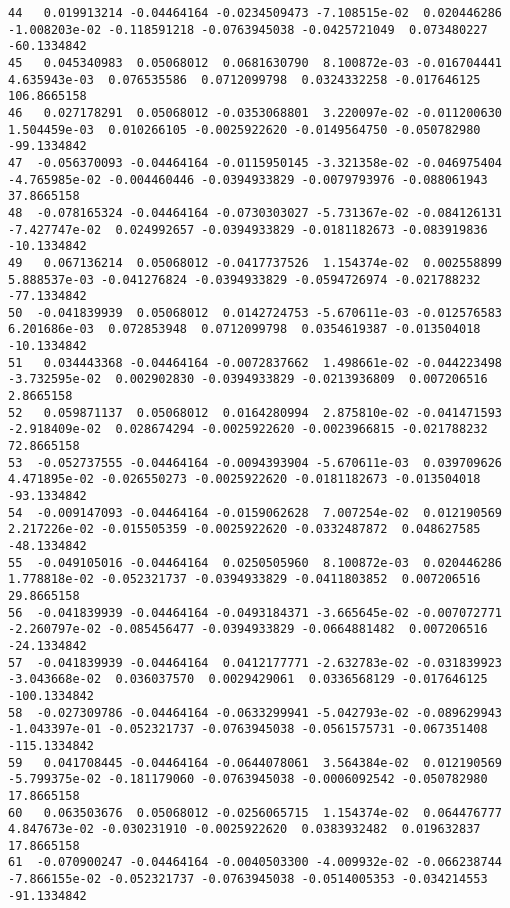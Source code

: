 \documentclass[15pt,a4paper,openright]{article}
\begin{document}
\begin{lstlisting}[language=AMPL, caption = data file]
44   0.019913214 -0.04464164 -0.0234509473 -7.108515e-02  0.020446286 -1.008203e-02 -0.118591218 -0.0763945038 -0.0425721049  0.073480227  -60.1334842
45   0.045340983  0.05068012  0.0681630790  8.100872e-03 -0.016704441  4.635943e-03  0.076535586  0.0712099798  0.0324332258 -0.017646125  106.8665158
46   0.027178291  0.05068012 -0.0353068801  3.220097e-02 -0.011200630  1.504459e-03  0.010266105 -0.0025922620 -0.0149564750 -0.050782980  -99.1334842
47  -0.056370093 -0.04464164 -0.0115950145 -3.321358e-02 -0.046975404 -4.765985e-02 -0.004460446 -0.0394933829 -0.0079793976 -0.088061943   37.8665158
48  -0.078165324 -0.04464164 -0.0730303027 -5.731367e-02 -0.084126131 -7.427747e-02  0.024992657 -0.0394933829 -0.0181182673 -0.083919836  -10.1334842
49   0.067136214  0.05068012 -0.0417737526  1.154374e-02  0.002558899  5.888537e-03 -0.041276824 -0.0394933829 -0.0594726974 -0.021788232  -77.1334842
50  -0.041839939  0.05068012  0.0142724753 -5.670611e-03 -0.012576583  6.201686e-03  0.072853948  0.0712099798  0.0354619387 -0.013504018  -10.1334842
51   0.034443368 -0.04464164 -0.0072837662  1.498661e-02 -0.044223498 -3.732595e-02  0.002902830 -0.0394933829 -0.0213936809  0.007206516    2.8665158
52   0.059871137  0.05068012  0.0164280994  2.875810e-02 -0.041471593 -2.918409e-02  0.028674294 -0.0025922620 -0.0023966815 -0.021788232   72.8665158
53  -0.052737555 -0.04464164 -0.0094393904 -5.670611e-03  0.039709626  4.471895e-02 -0.026550273 -0.0025922620 -0.0181182673 -0.013504018  -93.1334842
54  -0.009147093 -0.04464164 -0.0159062628  7.007254e-02  0.012190569  2.217226e-02 -0.015505359 -0.0025922620 -0.0332487872  0.048627585  -48.1334842
55  -0.049105016 -0.04464164  0.0250505960  8.100872e-03  0.020446286  1.778818e-02 -0.052321737 -0.0394933829 -0.0411803852  0.007206516   29.8665158
56  -0.041839939 -0.04464164 -0.0493184371 -3.665645e-02 -0.007072771 -2.260797e-02 -0.085456477 -0.0394933829 -0.0664881482  0.007206516  -24.1334842
57  -0.041839939 -0.04464164  0.0412177771 -2.632783e-02 -0.031839923 -3.043668e-02  0.036037570  0.0029429061  0.0336568129 -0.017646125 -100.1334842
58  -0.027309786 -0.04464164 -0.0633299941 -5.042793e-02 -0.089629943 -1.043397e-01 -0.052321737 -0.0763945038 -0.0561575731 -0.067351408 -115.1334842
59   0.041708445 -0.04464164 -0.0644078061  3.564384e-02  0.012190569 -5.799375e-02 -0.181179060 -0.0763945038 -0.0006092542 -0.050782980   17.8665158
60   0.063503676  0.05068012 -0.0256065715  1.154374e-02  0.064476777  4.847673e-02 -0.030231910 -0.0025922620  0.0383932482  0.019632837   17.8665158
61  -0.070900247 -0.04464164 -0.0040503300 -4.009932e-02 -0.066238744 -7.866155e-02 -0.052321737 -0.0763945038 -0.0514005353 -0.034214553  -91.1334842

\end{lstlisting}
\end{document}
